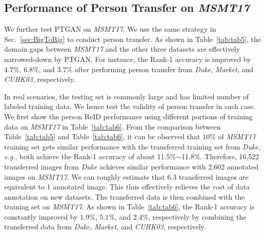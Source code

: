 \documentclass[10pt,twocolumn,letterpaper]{article}
\begin{document}
\subsection{Performance of Person Transfer on \textbf{\emph{MSMT17}}}
\label{sec:pku}
We further test PTGAN on \emph{MSMT17}. We use the same strategy in Sec.~\ref{sec:BigToBig} to conduct person transfer. As shown in Table~\ref{tab:tab5}, the domain gaps between \emph{MSMT17} and the other three datasets are effectively narrowed-down by PTGAN. For instance, the Rank-1 accuracy is improved by $4.7\%$, $6.8\%$, and $3.7\%$ after performing person transfer from \emph{Duke}, \emph{Market}, and \emph{CUHK03}, respectively.

In real scenarios, the testing set is commonly large and has limited number of labeled training data. We hence test the validity of person transfer in such case. We first show the person ReID performance using different portions of training data on \emph{MSMT17} in Table~\ref{tab:tab6}. From the comparison between Table~\ref{tab:tab5} and Table~\ref{tab:tab6}, it can be observed that $10\%$ of \emph{MSMT17} training set gets similar performance with the transferred training set from \emph{Duke}, \emph{e.g.}, both achieve the Rank-1 accuracy of about 11.5\%$\sim$11.8\%. Therefore, 16,522 transferred images from \emph{Duke} achieves similar performance with 2,602 annotated images on \emph{MSMT17}. We can roughly estimate that 6.3 transferred images are equivalent to 1 annotated image. This thus effectively relieves the cost of data annotation on new datasets. The transferred data is then combined with the training set on \emph{MSMT17}. As shown in Table~\ref{tab:tab6}, the Rank-1 accuracy is constantly improved by $1.9\%$, $5.1\%$, and $2.4\%$, respectively by combining the transferred data from \emph{Duke}, \emph{Market}, and \emph{CUHK03}, respectively.


\begin{table}
\footnotesize
\caption{The performance of GoogLeNet tested on \emph{MSMT17}. The subscript ${MS}$ denotes the transferred target dataset \emph{MSMT17}.}\label{tab:tab5}

\begin{center}
\vspace{-5mm}
\end{center}
\end{table}
\end{document}
